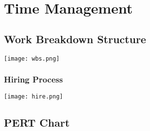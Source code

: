 \documentclass{beamer}
\begin{document}
\begin{frame}
\end{frame}

\section{Time Management}

\subsection{Work Breakdown Structure}

\begin{frame}
  \texttt{[image: wbs.png]}
\end{frame}

\begin{frame}
  \frametitle{Hiring Process}
  \texttt{[image: hire.png]}
\end{frame}

\subsection{PERT Chart}

\begin{frame}
\end{frame}
\end{document}
